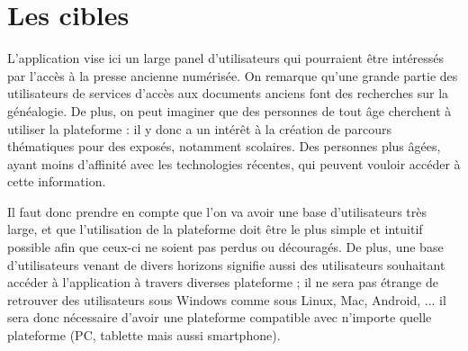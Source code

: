 \section{Les cibles}
\label{sec:cibles}
    L’application vise ici un large panel d’utilisateurs qui pourraient être intéressés
    par l’accès à la presse ancienne numérisée. On remarque qu’une grande partie
    des utilisateurs de services d’accès aux documents anciens font des recherches sur la généalogie.
    De plus, on peut imaginer que des personnes de tout âge cherchent à utiliser la plateforme :
    il y donc a un intérêt à la création de parcours thématiques pour des exposés, notamment scolaires.
    Des personnes plus âgées, ayant moins d’affinité avec les technologies récentes,
    qui peuvent vouloir accéder à cette information.

    Il faut donc prendre en compte que l’on va avoir une base d’utilisateurs très large,
    et que l’utilisation de la plateforme doit être le plus simple et intuitif possible
    afin que ceux-ci ne soient pas perdus ou découragés. De plus, une base d’utilisateurs
    venant de divers horizons signifie aussi des utilisateurs souhaitant accéder à l’application
    à travers diverses plateforme ; il ne sera pas étrange de retrouver des utilisateurs
    sous Windows comme sous Linux, Mac, Android, ... il sera donc nécessaire d’avoir une plateforme
    compatible avec n’importe quelle plateforme (PC, tablette mais aussi smartphone).
